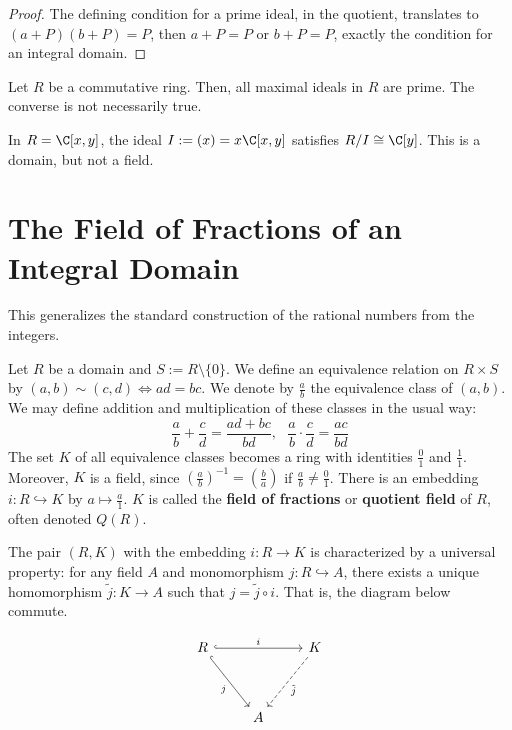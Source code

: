 \begin{proof}
    The defining condition for a prime ideal, in the quotient, translates to $(a+P)(b+P)=P$, then $a+P=P$ or $b+P=P$, exactly the condition for an integral domain.
\end{proof}

\begin{cor}
    Let $R$ be a commutative ring. Then, all maximal ideals in $R$ are prime. The converse is not necessarily true.
\end{cor}

\begin{ex}
    In $R = \C[x,y]$, the ideal $I:=(x)=x\C[x,y]$ satisfies $R/I \cong \C[y]$. This is a domain, but not a field.
\end{ex}

\section{The Field of Fractions of an Integral Domain}

This generalizes the standard construction of the rational numbers from the integers.

\begin{defn}
    Let $R$ be a domain and $S:= R\setminus \{0\}$. We define an equivalence relation on $R\times S$ by $(a,b) \sim (c,d) \iff ad=bc$. We denote by $\frac{a}{b}$ the equivalence class of $(a,b)$. We may define addition and multiplication of these classes in the usual way:
    $$\frac{a}{b}+\frac{c}{d}=\frac{ad+bc}{bd},\:\:\:\frac{a}{b}\cdot \frac{c}{d}=\frac{ac}{bd}$$
    The set $K$ of all equivalence classes becomes a ring with identities $\frac{0}{1}$ and $\frac{1}{1}$. Moreover, $K$ is a field, since $(\frac{a}{b})^{-1}=(\frac{b}{a})$ if $\frac{a}{b}\neq \frac{0}{1}$. There is an embedding $i:R \hookrightarrow K$ by $a \mapsto \frac{a}{1}$. $K$ is called the \textbf{field of fractions} or \textbf{quotient field} of $R$, often denoted $Q(R)$.
\end{defn}

\begin{prop}
    The pair $(R,K)$ with the embedding $i:R \to K$ is characterized by a universal property: for any field $A$ and monomorphism $j : R \hookrightarrow A$, there exists a unique homomorphism $\tilde j:K \to A$ such that $j = \tilde j \circ i$. That is, the diagram below commute.
\end{prop}

\[\begin{tikzcd}
	R && K \\
	\\
	& A
	\arrow["i", hook, from=1-1, to=1-3]
	\arrow["j"', hook, from=1-1, to=3-2]
	\arrow["{\tilde j}", dashed, from=1-3, to=3-2]
\end{tikzcd}\]

